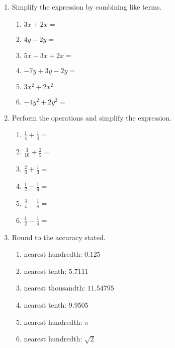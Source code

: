\documentclass[12pt, twoside]{article}
\begin{document}
\begin{enumerate}[itemsep=0.5cm]
\item Simplify the expression by combining like terms.
    \begin{multicols}{2}
    \begin{enumerate}[itemsep=0.5cm]
        \item $3x+2x=$
        \item $4y-2y=$
        \item $5x-3x+2x=$
        \item $-7y+3y-2y=$
        \item $3x^2+2x^2=$
        \item $-4y^2+2y^2=$
    \end{enumerate}
    \end{multicols}

\newpage

\item Perform the operations and simplify the expression.
\begin{multicols}{2}
\begin{enumerate}[itemsep=0.5cm]
    \item $\displaystyle \frac{1}{4} + \frac{1}{4} =$
    \item $\displaystyle \frac{3}{10} + \frac{2}{5} =$
    \item $\displaystyle \frac{2}{3} + \frac{1}{3} =$
    \item $\displaystyle \frac{1}{2} - \frac{1}{6} =$
    \item $\displaystyle \frac{3}{4} - \frac{1}{8} =$
    \item $\displaystyle \frac{1}{2} - \frac{1}{4} =$
\end{enumerate}
\end{multicols}


\item Round to the accuracy stated.
\begin{multicols}{2}
\begin{enumerate}[itemsep=0.75cm]
    \item nearest hundredth: $0.125$
    \item nearest tenth: $5.7111$
    \item nearest thousandth: $11.54795$
    \item nearest tenth: $9.9505$
    \item nearest hundredth: $\pi$
    \item nearest hundredth: $\sqrt{2}$
\end{enumerate}
\end{multicols} \vspace{0.5cm}


\end{enumerate}
\end{document}
